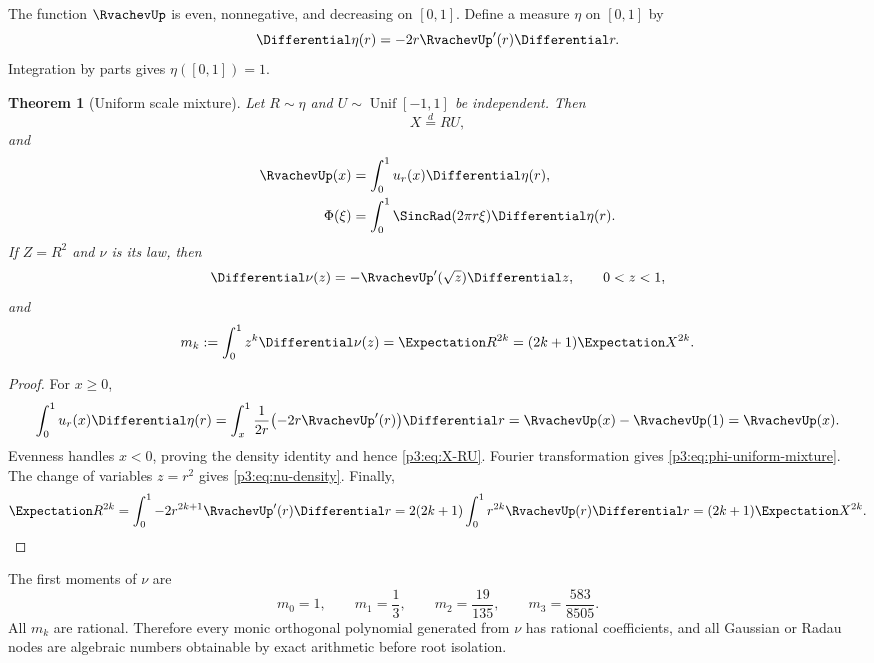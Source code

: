 \documentclass[11pt,oneside]{article}
\numberwithin{equation}{section}
\newtheorem{theorem}{Theorem}[section]
\theoremstyle{definition}
\theoremstyle{remark}
\begin{document}
The function $\RvachevUp$ is even, nonnegative, and decreasing on $[0,1]$.  Define a measure
$\eta$ on $[0,1]$ by
\begin{equation}
 \Differential\eta(r)=-2r\RvachevUp'(r)\Differential r.
 \label{p3:eq:eta}
\end{equation}
Integration by parts gives $\eta([0,1])=1$.

\begin{theorem}[Uniform scale mixture]
\label{p3:thm:scale-mixture}
Let $R\sim\eta$ and $U\sim\operatorname{Unif}[-1,1]$ be independent.  Then
\begin{equation}
 X\overset d=RU,
 \label{p3:eq:X-RU}
\end{equation}
and
\begin{align}
 \RvachevUp(x)&=\int_0^1u_r(x)\Differential\eta(r),
 \label{p3:eq:up-uniform-mixture}\\
 \Phi(\xi)&=\int_0^1\SincRad(2\pi r\xi)\Differential\eta(r).
 \label{p3:eq:phi-uniform-mixture}
\end{align}
If $Z=R^2$ and $\nu$ is its law, then
\begin{equation}
 \Differential\nu(z)=-\RvachevUp'(\sqrt z)\Differential z,
 \qquad 0<z<1,
 \label{p3:eq:nu-density}
\end{equation}
and
\begin{equation}
 m_k:=\int_0^1z^k\Differential\nu(z)
 =\Expectation R^{2k}=(2k+1)\Expectation X^{2k}.
 \label{p3:eq:nu-moments}
\end{equation}
\end{theorem}

\begin{proof}
For $x\ge0$,
\[
 \int_0^1u_r(x)\Differential\eta(r)
 =\int_x^1\frac{1}{2r}\bigl(-2r\RvachevUp'(r)\bigr)\Differential r
 =\RvachevUp(x)-\RvachevUp(1)=\RvachevUp(x).
\]
Evenness handles $x<0$, proving the density identity and hence \cref{p3:eq:X-RU}.
Fourier transformation gives \cref{p3:eq:phi-uniform-mixture}.  The change of variables
$z=r^2$ gives \cref{p3:eq:nu-density}.  Finally,
\[
 \Expectation R^{2k}=\int_0^1-2r^{2k+1}\RvachevUp'(r)\Differential r
 =2(2k+1)\int_0^1r^{2k}\RvachevUp(r)\Differential r
 =(2k+1)\Expectation X^{2k}.
\]
\end{proof}

The first moments of $\nu$ are
\begin{equation}
 m_0=1,
 \qquad m_1=\frac13,
 \qquad m_2=\frac{19}{135},
 \qquad m_3=\frac{583}{8505}.
 \label{p3:eq:nu-first-moments}
\end{equation}
All $m_k$ are rational.  Therefore every monic orthogonal polynomial generated from
$\nu$ has rational coefficients, and all Gaussian or Radau nodes are algebraic numbers
obtainable by exact arithmetic before root isolation.
\end{document}
